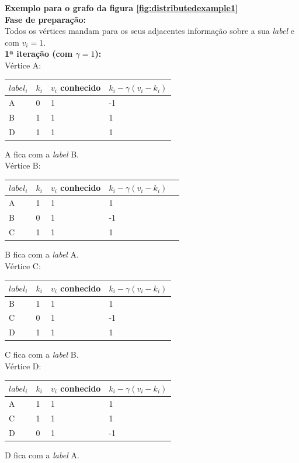 \documentclass[a4paper,10pt]{report}
\begin{document}
{\bf Exemplo para o grafo da figura \ref{fig:distributedexample1}}
\\[0.25cm]
{\bf Fase de preparação:}\\
Todos os vértices mandam para os seus adjacentes informação sobre a sua \textit{label} e com $v_i=1$. 
\\[0.25cm]
{\bf 1ª iteração (com $\gamma=1$):}
\\[0.25cm]
Vértice A:
  \begin{tabular}{| l | l | l | l |}
  \hline
  $label_i$ & $k_i$ & $v_i$ conhecido & $k_i - \gamma(v_i - k_i)$\\ \hline
  A & 0 & 1 & -1 \\ \hline
  B & 1 & 1 & 1 \\ \hline
  D & 1 & 1 & 1 \\ \hline
  \end{tabular}
  A fica com a \textit{label} B.
\\[0.25cm]
Vértice B:
  \begin{tabular}{| l | l | l | l | l |}
  \hline
  $label_i$ & $k_i$ & $v_i$ conhecido & $k_i - \gamma(v_i - k_i)$\\ \hline
  A & 1 & 1 & 1 \\ \hline
  B & 0 & 1 & -1 \\ \hline
  C & 1 & 1 & 1 \\ \hline
  \end{tabular}
  B fica com a \textit{label} A.
\\[0.25cm]
Vértice C:
  \begin{tabular}{| l | l | l | l |}
  \hline
  $label_i$ & $k_i$ & $v_i$ conhecido & $k_i - \gamma(v_i - k_i)$\\ \hline
  B & 1 & 1 & 1 \\ \hline
  C & 0 & 1 & -1 \\ \hline
  D & 1 & 1 & 1 \\ \hline
  \end{tabular}
  C fica com a \textit{label} B.
\\[0.25cm]
Vértice D:
  \begin{tabular}{| l | l | l | l |}
  \hline
  $label_i$ & $k_i$ & $v_i$ conhecido & $k_i - \gamma(v_i - k_i)$\\ \hline
  A & 1 & 1 & 1 \\ \hline
  C & 1 & 1 & 1 \\ \hline
  D & 0 & 1 & -1 \\ \hline
  \end{tabular}  
  D fica com a \textit{label} A.
  
\end{document}
